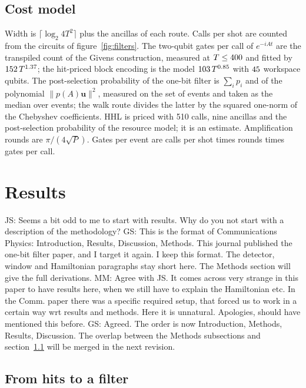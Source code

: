 \documentclass[11pt,a4paper]{article}
\newcommand{\js}[1]{{\color{blue} JS: #1 }}
\newcommand{\mm}[1]{{\color{purple} MM: #1 }}
\newcommand{\gs}[1]{{\color{orange!85!black} GS: #1 }}
\begin{document}
\subsection{Cost model}\label{sec:m:cost}
Width is $\lceil\log_2 4T^2\rceil$ plus the ancillas of each route. Calls per shot are counted
from the circuits of figure~\ref{fig:filters}. The two-qubit gates per call of $e^{-iAt}$ are the
transpiled count of the Givens construction, measured at $T\le400$ and fitted by
$152\,T^{1.37}$; the hit-priced block encoding is the model
$103\,T^{0.85}$ with $45$ workspace qubits. The post-selection
probability of the one-bit filter is $\sum_ip_i$ and of the polynomial
$\lVert p(A)\mathbf{u}\rVert^2$, measured on the set of events and taken as the median over events; the walk
route divides the latter by the squared one-norm of the Chebyshev coefficients. HHL is priced with
510 calls, nine ancillas and the post-selection probability of the resource model; it is an
estimate. Amplification rounds are $\pi/(4\sqrt P)$. Gates per event are calls per shot times
rounds times gates per call.

\section{Results}
\js{Seems a bit odd to me to start with results. Why do you not start with a description of the methodology?} \gs{This is the format of Communications Physics: Introduction, Results, Discussion, Methods. This journal published the one-bit filter paper, and I target it again. I keep this format. The detector, window and Hamiltonian paragraphs stay short here. The Methods section will give the full derivations.}
\mm{Agree with JS. It comes across very strange in this paper to have results here, when we still have to explain the Hamiltonian etc. In the Comm. paper there was a specific required setup, that forced us to work in a certain way wrt results and methods. Here it is unnatural. Apologies, should have mentioned this before.}
\gs{Agreed. The order is now Introduction, Methods, Results, Discussion. The overlap between the Methods subsections and section~\ref{sec:r1} will be merged in the next revision.}

\subsection{From hits to a filter}\label{sec:r1}
\end{document}
